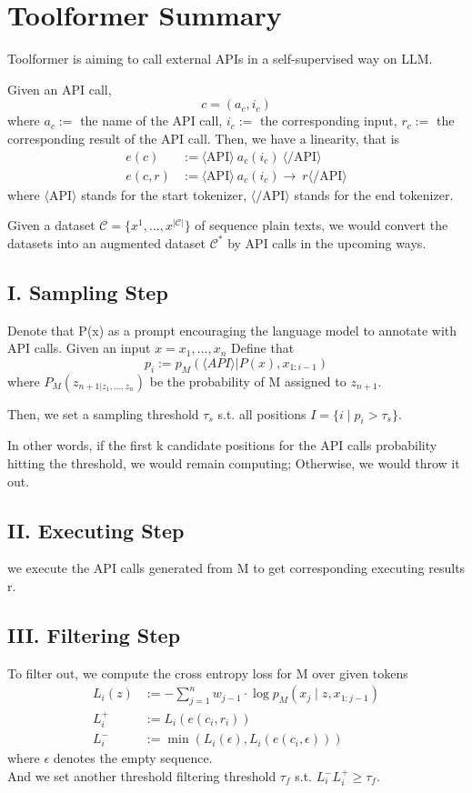 \documentclass[12pt]{article}
\begin{document}
\section*{Toolformer Summary}
Toolformer is aiming to call external APIs in a self-supervised way on LLM.

Given an API call, $$c = (a_c, i_c)$$
where $a_c :=$ the name of the API call, $i_c:=$ the corresponding input, $r_c :=$ the corresponding result of the API call.
Then, we have a linearity, that is
\begin{align*}
	e(c) &:= \langle\text{API}\rangle \  a_c(i_c)  \ \langle/ \text{API}\rangle \\
	e(c, r) &:= \langle\text{API}\rangle \  a_c(i_c)  \rightarrow \ r\langle/ \text{API}\rangle
\end{align*}
where $\langle\text{API}\rangle$ stands for the start tokenizer, $\langle / \text{API}\rangle$ stands for the end tokenizer.


Given a dataset $\mathcal{C} = \{x^1, ..., x^{|\mathcal{C}|}\}$ of sequence plain texts, we would convert the datasets into an augmented dataset $\mathcal{C}^*$ by API calls in the upcoming ways. 
\subsection*{I. Sampling Step}
Denote that P(x) as a prompt encouraging the language model to annotate with API calls.
Given an input $x = x_1, ..., x_n$
Define that
\begin{equation*}
	p_i := p_M (\langle API \rangle | P(x), x_{1:i-1})
\end{equation*}
where $P_M(z_{n+1 | z_1, ..., z_n})$ be the probability of M assigned to $z_{n+1}$.

Then, we set a sampling threshold $\tau_s$ s.t.  all positions $I = \{i \mid p_i > \tau_s\}$.

In other words, if the first k candidate positions for the API calls probability hitting the threshold, we would remain computing; Otherwise, we would throw it out.

\subsection*{II. Executing Step}
we execute the API calls generated from M to get corresponding executing results r.

\subsection*{III. Filtering Step}
To filter out, we compute the cross entropy loss for M over given tokens
\begin{align*}
L_i(z) &:= - \sum_{j=1}^{n} w_{j-1} \cdot \log p_M (x_j \mid z, x_{1: j-1})\\
L_i^+&:= L_i(e(c_i, r_i))	\\
L_i^- &:= \min (L_i(\epsilon), L_i(e(c_i, \epsilon)))
\end{align*}
where $\epsilon$ denotes the empty sequence.\\
And we set another threshold filtering threshold $\tau_f$ s.t. $L_i^-  L_i^+ \geq \tau_f$.
\end{document}
